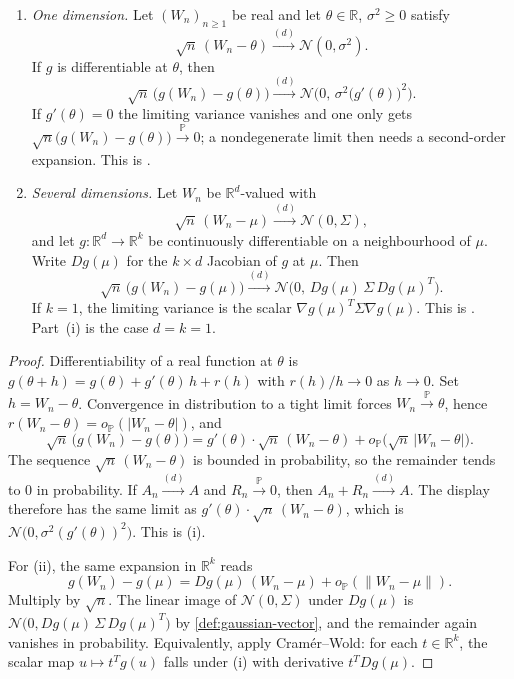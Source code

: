 \documentclass[11pt,a4paper]{article}
\DeclareMathOperator{\Pbb}{\mathbb{P}}
\begin{document}
\begin{theorem}
\label{thm:delta-method}
\label{thm:delta-method-mv}
\begin{enumerate}[label=\textup{(\roman*)}]
    \item
    \emph{One dimension.} Let \( (W_n)_{n\ge 1} \) be real and let \( \theta\in\mathbb{R} \), \( \sigma^{2}\ge 0 \) satisfy
    \[
    \sqrt{n}\,(W_n-\theta)
    \xrightarrow{(d)}
    \mathcal{N}(0,\sigma^{2}).
    \]
    If \( g \) is differentiable at \( \theta \), then
    \[
    \sqrt{n}\,\bigl(g(W_n)-g(\theta)\bigr)
    \xrightarrow{(d)}
    \mathcal{N}\bigl(0,\,\sigma^{2}\bigl(g'(\theta)\bigr)^{2}\bigr).
    \]
    If \( g'(\theta)=0 \) the limiting variance vanishes and one only gets \( \sqrt{n}\bigl(g(W_n)-g(\theta)\bigr)\xrightarrow{\Pbb}0 \); a nondegenerate limit then needs a second-order expansion. This is \citep[Theorem~5.2.9]{hogg2019}.
    \item
    \emph{Several dimensions.} Let \( W_n \) be \(\mathbb{R}^{d}\)-valued with
    \[
    \sqrt{n}\,(W_n-\mu)
    \xrightarrow{(d)}
    \mathcal{N}(0,\Sigma),
    \]
    and let \( g:\mathbb{R}^{d}\to\mathbb{R}^{k} \) be continuously differentiable on a neighbourhood of \( \mu \). Write \( Dg(\mu) \) for the \( k\times d \) Jacobian of \( g \) at \( \mu \). Then
    \[
    \sqrt{n}\,\bigl(g(W_n)-g(\mu)\bigr)
    \xrightarrow{(d)}
    \mathcal{N}\bigl(0,\,Dg(\mu)\,\Sigma\,Dg(\mu)^{T}\bigr).
    \]
    If \( k=1 \), the limiting variance is the scalar \( \nabla g(\mu)^{T}\Sigma\nabla g(\mu) \). This is \citep[Theorem~5.4.6]{hogg2019}. Part~(i) is the case \( d=k=1 \).
\end{enumerate}
\end{theorem}

\begin{proof}
Differentiability of a real function at \( \theta \) is \( g(\theta+h)=g(\theta)+g'(\theta)\,h+r(h) \) with \( r(h)/h\to 0 \) as \( h\to 0 \). Set \( h=W_n-\theta \). Convergence in distribution to a tight limit forces \( W_n\xrightarrow{\Pbb}\theta \), hence \( r(W_n-\theta)=o_{\Pbb}(|W_n-\theta|) \), and
\[
\sqrt{n}\,\bigl(g(W_n)-g(\theta)\bigr)
=
g'(\theta)\cdot\sqrt{n}\,(W_n-\theta)
+
o_{\Pbb}\bigl(\sqrt{n}\,|W_n-\theta|\bigr).
\]
The sequence \( \sqrt{n}\,(W_n-\theta) \) is bounded in probability, so the remainder tends to \( 0 \) in probability. If \( A_n\xrightarrow{(d)}A \) and \( R_n\xrightarrow{\Pbb}0 \), then \( A_n+R_n\xrightarrow{(d)}A \). The display therefore has the same limit as \( g'(\theta)\cdot\sqrt{n}\,(W_n-\theta) \), which is \( \mathcal{N}\bigl(0,\sigma^{2}(g'(\theta))^{2}\bigr) \). This is (i).

For (ii), the same expansion in \( \mathbb{R}^{k} \) reads
\[
g(W_n)-g(\mu)
=
Dg(\mu)\,(W_n-\mu)+o_{\Pbb}(\|W_n-\mu\|).
\]
Multiply by \( \sqrt{n} \). The linear image of \( \mathcal{N}(0,\Sigma) \) under \( Dg(\mu) \) is \( \mathcal{N}\bigl(0,Dg(\mu)\,\Sigma\,Dg(\mu)^{T}\bigr) \) by \cref{def:gaussian-vector}, and the remainder again vanishes in probability. Equivalently, apply Cramér--Wold: for each \( t\in\mathbb{R}^{k} \), the scalar map \( u\mapsto t^{T}g(u) \) falls under (i) with derivative \( t^{T}Dg(\mu) \).
\end{proof}
\end{document}
